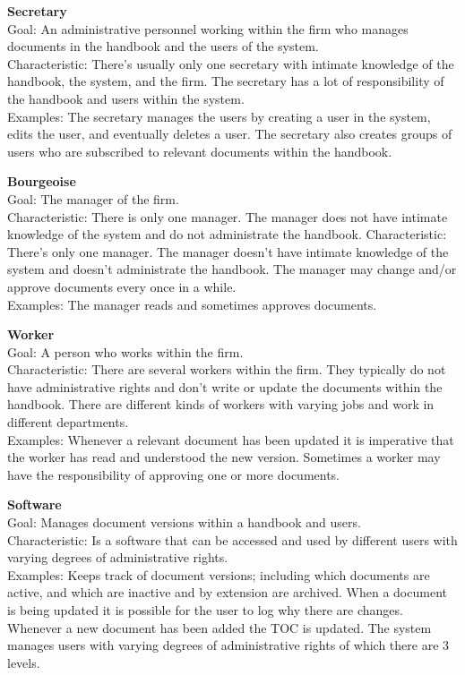\textbf{Secretary}
\\
Goal: An administrative personnel working within the firm who manages documents in the handbook and the users of the system.
\\
Characteristic: There’s usually only one secretary with intimate knowledge of the handbook, the system, and the firm.
The secretary has a lot of responsibility of the handbook and users within the system.
\\
Examples: The secretary manages the users by creating a user in the system, edits the user, and eventually deletes a user.
The secretary also creates groups of users who are subscribed to relevant documents within the handbook.

\textbf{Bourgeoise}
\\
Goal: The manager of the firm.
\\
Characteristic: There is only one manager.
The manager does not have intimate knowledge of the system and do not administrate the handbook.
Characteristic: There’s only one manager.
The manager doesn’t have intimate knowledge of the system and doesn’t administrate the handbook.
The manager may change and/or approve documents every once in a while.
\\
Examples: The manager reads and sometimes approves documents.

\textbf{Worker}
\\
Goal: A person who works within the firm.
\\
Characteristic: There are several workers within the firm.
They typically do not have administrative rights and don’t write or update the documents within the handbook.
There are different kinds of workers with varying jobs and work in different departments.
\\
Examples: Whenever a relevant document has been updated it is imperative that the worker has read and understood the new version.
Sometimes a worker may have the responsibility of approving one or more documents.

\textbf{Software}
\\
Goal: Manages document versions within a handbook and users.
\\
Characteristic:
Is a software that can be accessed and used by different users with varying degrees of administrative rights.
\\
Examples: Keeps track of document versions; including which documents are active, and which are inactive and by extension are archived.
When a document is being updated it is possible for the user to log why there are changes.
Whenever a new document has been added the TOC is updated.
The system manages users with varying degrees of administrative rights of which there are 3 levels.


